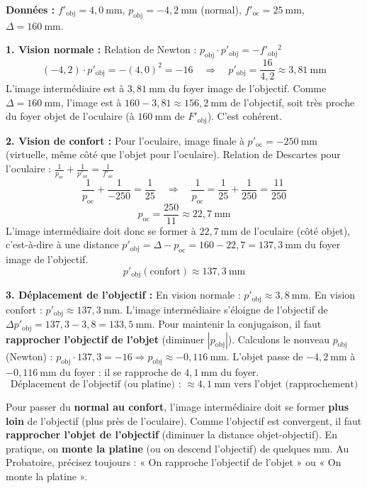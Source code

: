 \documentclass[11pt]{article}
\begin{document}
\begin{exoresolu}
\textbf{Données :} $f'_{\text{obj}} = 4,0\ \text{mm}$, $p_{\text{obj}} = -4,2\ \text{mm}$ (normal), $f'_{\text{oc}} = 25\ \text{mm}$, $\Delta = 160\ \text{mm}$.

\textbf{1. Vision normale :}
Relation de Newton : $p_{\text{obj}} \cdot p'_{\text{obj}} = -f'_{\text{obj}}{}^2$
\[
(-4,2) \cdot p'_{\text{obj}} = -(4,0)^2 = -16 \quad \Rightarrow \quad p'_{\text{obj}} = \frac{16}{4,2} \approx 3,81\ \text{mm}
\]
L'image intermédiaire est à $3,81\ \text{mm}$ du foyer image de l'objectif. Comme $\Delta = 160\ \text{mm}$, l'image est à $160 - 3,81 \approx 156,2\ \text{mm}$ de l'objectif, soit très proche du foyer objet de l'oculaire (à $160\ \text{mm}$ de $F'_{\text{obj}}$). C'est cohérent.

\textbf{2. Vision de confort :}
Pour l'oculaire, image finale à $p'_{\text{oc}} = -250\ \text{mm}$ (virtuelle, même côté que l'objet pour l'oculaire).
Relation de Descartes pour l'oculaire : $\frac{1}{p_{\text{oc}}} + \frac{1}{p'_{\text{oc}}} = \frac{1}{f'_{\text{oc}}}$
\[
\frac{1}{p_{\text{oc}}} + \frac{1}{-250} = \frac{1}{25} \quad \Rightarrow \quad \frac{1}{p_{\text{oc}}} = \frac{1}{25} + \frac{1}{250} = \frac{11}{250}
\]
\[
p_{\text{oc}} = \frac{250}{11} \approx 22,7\ \text{mm}
\]
L'image intermédiaire doit donc se former à $22,7\ \text{mm}$ de l'oculaire (côté objet), c'est-à-dire à une distance $p'_{\text{obj}} = \Delta - p_{\text{oc}} = 160 - 22,7 = 137,3\ \text{mm}$ du foyer image de l'objectif.
\[
\boxed{p'_{\text{obj}}(\text{confort}) \approx 137,3\ \text{mm}}
\]

\textbf{3. Déplacement de l'objectif :}
En vision normale : $p'_{\text{obj}} \approx 3,8\ \text{mm}$.
En vision confort : $p'_{\text{obj}} \approx 137,3\ \text{mm}$.
L'image intermédiaire s'éloigne de l'objectif de $\Delta p'_{\text{obj}} = 137,3 - 3,8 = 133,5\ \text{mm}$.
Pour maintenir la conjugaison, il faut \textbf{rapprocher l'objectif de l'objet} (diminuer $|p_{\text{obj}}|$).
Calculons le nouveau $p_{\text{obj}}$ (Newton) : $p_{\text{obj}} \cdot 137,3 = -16 \Rightarrow p_{\text{obj}} \approx -0,116\ \text{mm}$.
L'objet passe de $-4,2\ \text{mm}$ à $-0,116\ \text{mm}$ du foyer : il se rapproche de $4,1\ \text{mm}$ du foyer.
\[
\boxed{\text{Déplacement de l'objectif (ou platine) : } \approx 4,1\ \text{mm vers l'objet (rapprochement)}}
\]

\begin{attention}
Pour passer du \textbf{normal au confort}, l'image intermédiaire doit se former \textbf{plus loin} de l'objectif (plus près de l'oculaire). Comme l'objectif est convergent, il faut \textbf{rapprocher l'objet de l'objectif} (diminuer la distance objet-objectif). En pratique, on \textbf{monte la platine} (ou on descend l'objectif) de quelques mm. Au Probatoire, précisez toujours : « On rapproche l'objectif de l'objet » ou « On monte la platine ».
\end{attention}
\end{exoresolu}
\end{document}
